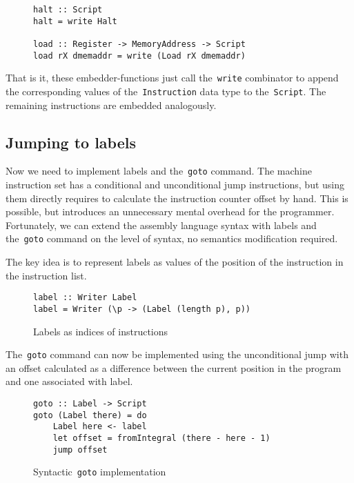 \begin{figure}[H]
\begin{verbatim}
halt :: Script
halt = write Halt

load :: Register -> MemoryAddress -> Script
load rX dmemaddr = write (Load rX dmemaddr)
\end{verbatim}
\end{figure}

That is it, these embedder-functions just call the~\texttt{write}
combinator to append the corresponding values of the~\texttt{Instruction}
data type to the~\texttt{Script}. The remaining instructions are embedded
analogously.

\subsection{Jumping to labels}

Now we need to implement labels and the~\texttt{goto} command. The machine
instruction set has a conditional and unconditional jump instructions, but using them
directly requires to calculate the instruction counter offset by hand. This is possible,
but introduces an unnecessary mental overhead for the programmer. Fortunately, we
can extend the assembly language syntax with labels and the~\texttt{goto}
command on the level of syntax, no semantics modification required.

The key idea is to represent labels as values of the position of the instruction
in the instruction list.

\begin{figure}[H]
\begin{verbatim}
label :: Writer Label
label = Writer (\p -> (Label (length p), p))
\end{verbatim}
\caption{Labels as indices of instructions}
\label{label}
\end{figure}

The~\texttt{goto} command can now be implemented using the unconditional
jump with an offset calculated as a difference between the current position in the
program and one associated with label.

\begin{figure}[H]
\begin{verbatim}
goto :: Label -> Script
goto (Label there) = do
    Label here <- label
    let offset = fromIntegral (there - here - 1)
    jump offset
\end{verbatim}
\caption{Syntactic~\texttt{goto} implementation}
\label{goto}
\end{figure}

